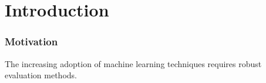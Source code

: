 \section{Introduction}


\begin{frame}
    \frametitle{Motivation}
    \vspace{3mm}

    The increasing adoption of machine learning techniques requires robust evaluation methods.

    \vfill 
\end{frame}

